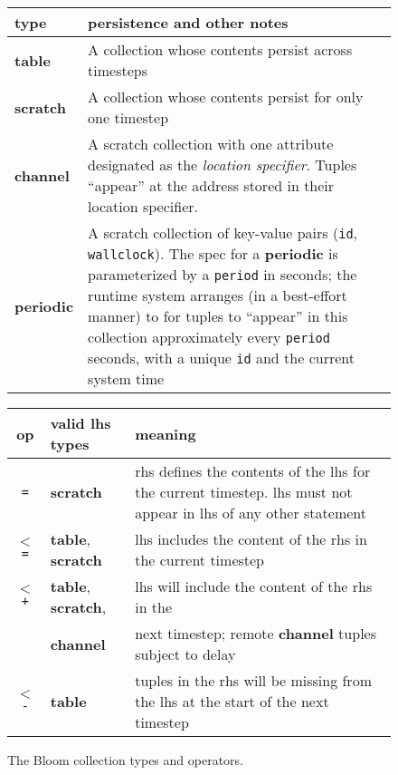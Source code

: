 \begin{figure}
	\begin{small}
	\begin{tabular}{|l|p{2.55in}|}
		\hline
		type & persistence and other notes\\
		\hline
		\textbf{table} & A collection whose contents persist across timesteps\\
		\textbf{scratch} & A collection whose contents persist for only one timestep\\
		\textbf{channel} & A scratch collection with one attribute designated as the {\em location specifier}. Tuples ``appear'' at the address stored in their location specifier.\\
		\textbf{periodic} & A scratch collection of key-value pairs (\texttt{id}, \texttt{wallclock}).  The spec for a \textbf{periodic} is parameterized by a \texttt{period} in seconds; the runtime system arranges (in a best-effort manner) to for tuples to ``appear'' in this collection approximately every \texttt{period} seconds, with a unique \texttt{id} and the current system time\\
		\hline
	\end{tabular}

	\vspace{2em}
	
	\begin{tabular}{|c|l|p{2in}|}
		\hline
		op & valid lhs types & meaning\\
				\hline 
		\texttt{=} & \textbf{scratch} & rhs defines the contents of the lhs for the current timestep.  lhs must not appear in lhs of any other statement\\
		\texttt{$<$=} & \textbf{table}, \textbf{scratch} & lhs includes the content of the rhs in the current timestep\\
		\texttt{$<$+} & \textbf{table}, \textbf{scratch}, & lhs will include the content of the rhs in the\\
		              & \textbf{channel} &  next timestep; remote \textbf{channel} tuples subject to delay \\
		\texttt{$<$-} & \textbf{table} & tuples in the rhs will be missing from the lhs at the start of  the next timestep\\
		\hline
	\end{tabular}
	\end{small}
	\caption{The Bloom collection types and operators.}
	\label{tab:bloom}
\end{figure}

